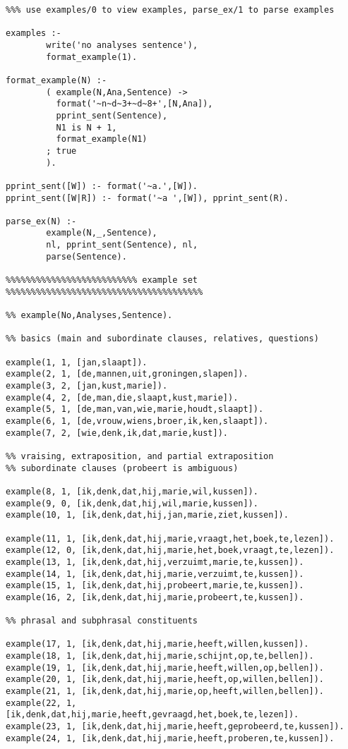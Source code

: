 \begin{verbatim}
%%% use examples/0 to view examples, parse_ex/1 to parse examples

examples :-
        write('no analyses sentence'),
        format_example(1).
        
format_example(N) :-
        ( example(N,Ana,Sentence) ->
          format('~n~d~3+~d~8+',[N,Ana]),
          pprint_sent(Sentence),
          N1 is N + 1,
          format_example(N1)
        ; true
        ).

pprint_sent([W]) :- format('~a.',[W]).
pprint_sent([W|R]) :- format('~a ',[W]), pprint_sent(R).
        
parse_ex(N) :-
        example(N,_,Sentence),
        nl, pprint_sent(Sentence), nl,
        parse(Sentence).

%%%%%%%%%%%%%%%%%%%%%%%%%% example set %%%%%%%%%%%%%%%%%%%%%%%%%%%%%%%%%%%%%%%

%% example(No,Analyses,Sentence).

%% basics (main and subordinate clauses, relatives, questions)

example(1, 1, [jan,slaapt]).
example(2, 1, [de,mannen,uit,groningen,slapen]).
example(3, 2, [jan,kust,marie]).
example(4, 2, [de,man,die,slaapt,kust,marie]).
example(5, 1, [de,man,van,wie,marie,houdt,slaapt]).
example(6, 1, [de,vrouw,wiens,broer,ik,ken,slaapt]).
example(7, 2, [wie,denk,ik,dat,marie,kust]).

%% vraising, extraposition, and partial extraposition
%% subordinate clauses (probeert is ambiguous)

example(8, 1, [ik,denk,dat,hij,marie,wil,kussen]).
example(9, 0, [ik,denk,dat,hij,wil,marie,kussen]).
example(10, 1, [ik,denk,dat,hij,jan,marie,ziet,kussen]).

example(11, 1, [ik,denk,dat,hij,marie,vraagt,het,boek,te,lezen]).
example(12, 0, [ik,denk,dat,hij,marie,het,boek,vraagt,te,lezen]).
example(13, 1, [ik,denk,dat,hij,verzuimt,marie,te,kussen]).
example(14, 1, [ik,denk,dat,hij,marie,verzuimt,te,kussen]).
example(15, 1, [ik,denk,dat,hij,probeert,marie,te,kussen]).
example(16, 2, [ik,denk,dat,hij,marie,probeert,te,kussen]).

%% phrasal and subphrasal constituents

example(17, 1, [ik,denk,dat,hij,marie,heeft,willen,kussen]).
example(18, 1, [ik,denk,dat,hij,marie,schijnt,op,te,bellen]).
example(19, 1, [ik,denk,dat,hij,marie,heeft,willen,op,bellen]).
example(20, 1, [ik,denk,dat,hij,marie,heeft,op,willen,bellen]).
example(21, 1, [ik,denk,dat,hij,marie,op,heeft,willen,bellen]).
example(22, 1, [ik,denk,dat,hij,marie,heeft,gevraagd,het,boek,te,lezen]).
example(23, 1, [ik,denk,dat,hij,marie,heeft,geprobeerd,te,kussen]).
example(24, 1, [ik,denk,dat,hij,marie,heeft,proberen,te,kussen]).


\end{verbatim}
